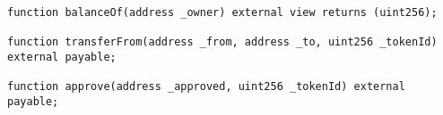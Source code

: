 \begin{lstlisting}[language=Solidity]
function balanceOf(address _owner) external view returns (uint256);

function transferFrom(address _from, address _to, uint256 _tokenId) external payable;

function approve(address _approved, uint256 _tokenId) external payable;
\end{lstlisting}